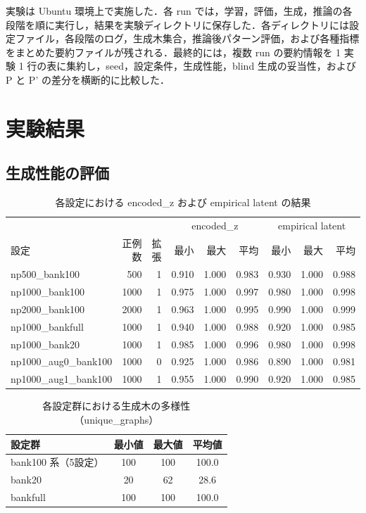 \documentclass[submit,techrep,noauthor]{ipsj}
\begin{document}

実験は Ubuntu 環境上で実施した．各 run では，学習，評価，生成，推論の各段階を順に実行し，結果を実験ディレクトリに保存した．各ディレクトリには設定ファイル，各段階のログ，生成木集合，推論後パターン評価，および各種指標をまとめた要約ファイルが残される．最終的には，複数 run の要約情報を 1 実験 1 行の表に集約し，seed，設定条件，生成性能，blind 生成の妥当性，および P と P' の差分を横断的に比較した．

\section{実験結果}

\subsection{生成性能の評価}

\begin{table}[t]
\centering
\small
\caption{各設定における encoded\_z および empirical latent の結果}
\label{tab:results}
\begin{tabular}{lrr|rrr|rrr}
\toprule
& & & \multicolumn{3}{c|}{encoded\_z} & \multicolumn{3}{c}{empirical latent} \\
設定 & 正例数 & 拡張 & 最小 & 最大 & 平均 & 最小 & 最大 & 平均 \\
\midrule
np500\_bank100   & 500  & 1 & 0.910 & 1.000 & 0.983 & 0.930 & 1.000 & 0.988 \\
np1000\_bank100  & 1000 & 1 & 0.975 & 1.000 & 0.997 & 0.980 & 1.000 & 0.998 \\
np2000\_bank100  & 2000 & 1 & 0.963 & 1.000 & 0.995 & 0.990 & 1.000 & 0.999 \\
np1000\_bankfull & 1000 & 1 & 0.940 & 1.000 & 0.988 & 0.920 & 1.000 & 0.985 \\
np1000\_bank20   & 1000 & 1 & 0.985 & 1.000 & 0.996 & 0.980 & 1.000 & 0.998 \\
np1000\_aug0\_bank100 & 1000 & 0 & 0.925 & 1.000 & 0.986 & 0.890 & 1.000 & 0.981 \\
np1000\_aug1\_bank100 & 1000 & 1 & 0.955 & 1.000 & 0.990 & 0.920 & 1.000 & 0.985 \\
\bottomrule
\end{tabular}
\end{table}

\begin{table}[t]
\centering
\small
\caption{各設定群における生成木の多様性（unique\_graphs）}
\label{tab:unique-graphs}
\begin{tabular}{lccc}
\toprule
設定群 & 最小値 & 最大値 & 平均値 \\
\midrule
bank100 系（5設定） & 100 & 100 & 100.0 \\
bank20              & 20  & 62  & 28.6 \\
bankfull            & 100 & 100 & 100.0 \\
\bottomrule
\end{tabular}
\end{table}
\end{document}
